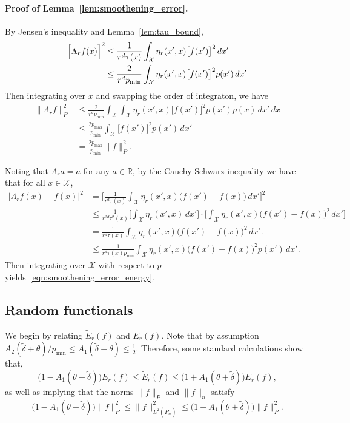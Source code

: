\documentclass[twoside]{article}
\newcommand{\Reals}{\mathbb{R}}
\newcommand{\1}{\mathbf{1}}
\newcommand{\Xset}{\mathcal{X}}
\newcommand{\Leb}{L}
\newcommand{\wt}[1]{\widetilde{#1}}
\theoremstyle{definition}
\theoremstyle{remark}
\begin{document}
\paragraph{Proof of Lemma~\ref{lem:smoothening_error}.}
By Jensen's inequality and Lemma~\ref{lem:tau_bound},
\begin{align*}
\Bigl[\Lambda_rf(x)\Bigr]^2 & \leq \frac{1}{r^d \tau(x)}\int_{\Xset} \eta_r(x',x) \bigl[f(x')\bigr]^2 \,dx' \\
& \leq \frac{2}{r^d p_{\min}}\int_{\Xset} \eta_r(x',x) \bigl[f(x')\bigr]^2 p(x') \,dx'
\end{align*}
Then integrating over $x$ and swapping the order of integraton, we have
\begin{align*}
\bigl\|\Lambda_rf\bigr\|_{P}^2 & \leq \frac{2}{r^d p_{\min}} \int_{\Xset} \int_{\Xset} \eta_r(x',x) \bigl[f(x')\bigr]^2 p(x') p(x) \,dx' \,dx \\ 
& \leq \frac{2p_{\max}}{p_{\min}} \int_{\Xset} \bigl[f(x')\bigr]^2 p(x') \,dx' \\
& = \frac{2p_{\max}}{p_{\min}} \|f\|_{P}^2.
\end{align*}

Noting that $\Lambda_ra = a$ for any $a \in \Reals$, by the Cauchy-Schwarz inequality we have that for all $x \in \Xset$,
\begin{align*}
\bigl|\Lambda_rf(x) - f(x)\bigr|^2 & = \biggl[\frac{1}{r^d\tau(x)} \int_{\Xset} \eta_r(x',x) \bigl(f(x') - f(x)\bigr) \,dx'\biggr]^2 \\
& \leq \frac{1}{r^{2d} \tau^2(x)} \biggl[\int_{\Xset} \eta_r(x',x) \,dx'\biggr] \cdot \biggl[\int_{\Xset} \eta_r(x',x) \bigl(f(x') - f(x)\bigr)^2 \,dx'\biggr] \\
& = \frac{1}{r^d \tau(x)} \int_{\Xset} \eta_r(x',x) \bigl(f(x') - f(x)\bigr)^2 \,dx'. \\
& \leq \frac{1}{r^d \tau(x) p_{\min}} \int_{\Xset} \eta_r(x',x) \bigl(f(x') - f(x)\bigr)^2 p(x') \,dx'.
\end{align*}
Then integrating over $\Xset$ with respect to $p$ yields~\eqref{eqn:smoothening_error_energy}.



\subsection{Random functionals}
\label{subsec:random_functionals}

We begin by relating $\wt{E}_r(f)$ and $E_r(f)$. Note that by assumption $A_2(\wt{\delta} + \theta)/p_{\min} \leq A_1(\wt{\delta} + \theta) \leq \frac{1}{2}$. Therefore, some standard calculations show that,
\begin{equation}
\label{eqn:calder19_1}
\bigl(1 - A_1(\theta + \wt{\delta})\bigr) E_r(f) \leq \wt{E}_r(f) \leq \bigl(1 + A_1(\theta + \wt{\delta})\bigr) E_r(f),
\end{equation}
as well as implying that the norms $\|f\|_{P}$ and $\|f\|_{n}$ satisfy
\begin{equation}
\label{eqn:calder19_2}
\bigl(1 - A_1(\theta + \wt{\delta})\bigr) \|f\|_{P}^2 \leq \|f\|_{\Leb^2(\wt{P}_n)}^2 \leq \bigl(1 + A_1(\theta + \wt{\delta})\bigr) \|f\|_{P}^2.
\end{equation}
\end{document}
